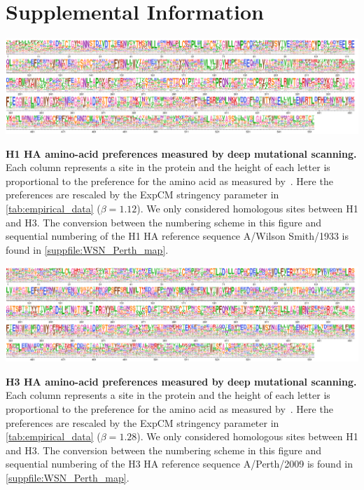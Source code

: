 \documentclass[11pt]{article}
\begin{document}
\newpage
\section*{Supplemental Information}

\begin{suppfig}[H]
\centerline{\includegraphics[width=\textwidth]{figures/prefs_doud}}
\caption{\label{suppfig:prefs_doud}
\textbf{H1 HA amino-acid preferences measured by deep mutational scanning.}
Each column represents a site in the protein and the height of each letter is proportional to the preference for the amino acid as measured by~\citet{doud2016accurate}. 
Here the preferences are rescaled by the ExpCM stringency parameter in \ref{tab:empirical_data} ($\beta=1.12$). 
We only considered homologous sites between H1 and H3. 
The conversion between the numbering scheme in this figure and sequential numbering of the H1 HA reference sequence A/Wilson Smith/1933 is found in \ref{suppfile:WSN_Perth_map}. 
}
\end{suppfig}

\begin{suppfig}[H]
\centerline{\includegraphics[width=\textwidth]{figures/prefs_lee}}
\caption{\label{suppfig:prefs_lee}
\textbf{H3 HA amino-acid preferences measured by deep mutational scanning.}
Each column represents a site in the protein and the height of each letter is proportional to the preference for the amino acid as measured by~\citet{lee2018deep}. 
Here the preferences are rescaled by the ExpCM stringency parameter in \ref{tab:empirical_data} ($\beta=1.28$). 
We only considered homologous sites between H1 and H3. 
The conversion between the numbering scheme in this figure and sequential numbering of the H3 HA reference sequence A/Perth/2009 is found in \ref{suppfile:WSN_Perth_map}. 
 }
\end{suppfig}
\end{document}
